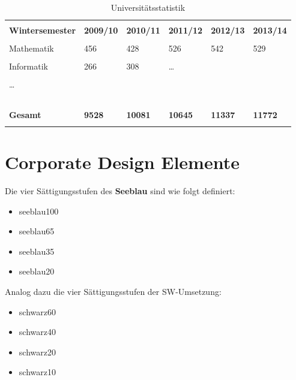\begin{table}
\caption{Universitätsstatistik}
\label{tbl:Uni}
\begin{tabu} {X[l]X[r]X[r]X[r]X[r]X[r]}
\unitoprule \\
\textbf{Wintersemester} & \textbf{2009/10} & \textbf{2010/11} & \textbf{2011/12} & \textbf{2012/13} & \textbf{2013/14} \\
\unitoprule \\
Mathematik & 456 & 428 & 526 & 542 & 529 \\
\unimidrule \\
Informatik & 266 & 308 & \ldots \\
\unimidrule \\
\ldots \\
\unimidrule \\
 \\
\unimidrule \\
 \\
\unitoprule \\
\textbf{Gesamt} & \textbf{9528} & \textbf{10081} & \textbf{10645} & \textbf{11337} & \textbf{11772} \\
\unitoprule \\
\end{tabu}
\end{table}

\normalsize

\chapter{Corporate Design Elemente}

Die vier Sättigungsstufen des \textbf{Seeblau} sind wie folgt definiert:

\begin{itemize}
\item \textcolor{seeblau100}{seeblau100}
\item \textcolor{seeblau65}{seeblau65}
\item \textcolor{seeblau35}{seeblau35}
\item \textcolor{seeblau20}{seeblau20}\\
\end{itemize}

\noindent Analog dazu die vier Sättigungsstufen der SW-Umsetzung:

\begin{itemize}
\item \textcolor{schwarz60}{schwarz60}
\item \textcolor{schwarz40}{schwarz40}
\item \textcolor{schwarz20}{schwarz20}
\item \textcolor{schwarz10}{schwarz10}\\
\end{itemize}



